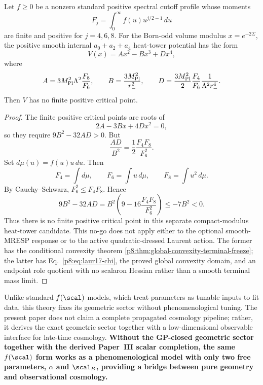 \documentclass[12pt,a4paper]{article}
\begin{document}
\begin{theorem}
\label{p8:thm:positive-heat-tower-a4-nogo}
Let \(f\ge0\) be a nonzero standard positive spectral cutoff profile whose moments
\[
F_j=\int_0^\infty f(u)u^{j/2-1}\,du
\]
are finite and positive for \(j=4,6,8\).
For the Born-odd volume modulus \(x=e^{-2\Sigma}\), the positive smooth internal \(a_0+a_2+a_4\) heat-tower potential has the form
\[
V(x)=Ax^2-Bx^3+Dx^4,
\]
where
\[
A=3M_{\rm Pl}^2\Lambda^2\frac{F_8}{F_6},\qquad
B=\frac{3M_{\rm Pl}^2}{r_-^2},\qquad
D=\frac{3M_{\rm Pl}^2}{2}\frac{F_4}{F_6}\frac{1}{\Lambda^2r_-^4}.
\]
Then \(V\) has no finite positive critical point.
\end{theorem}

\begin{proof}
The finite positive critical points are roots of
\[
2A-3Bx+4Dx^2=0,
\]
so they require \(9B^2-32AD>0\).  But
\[
\frac{AD}{B^2}=\frac12\frac{F_4F_8}{F_6^2}.
\]
Set \(d\mu(u)=f(u)u\,du\). Then
\[
F_4=\int d\mu,\qquad F_6=\int u\,d\mu,\qquad F_8=\int u^2\,d\mu.
\]
By Cauchy--Schwarz, \(F_6^2\le F_4F_8\). Hence
\[
9B^2-32AD
=
B^2\left(9-16\frac{F_4F_8}{F_6^2}\right)
\le -7B^2<0.
\]
Thus there is no finite positive critical point in this separate
compact-modulus heat-tower candidate.  This no-go does not apply either to
the optional smooth-MRESP response or to the active quadratic-dressed Laurent
action.  The former has the conditional convexity theorem
\ref{p8:thm:global-convexity-terminal-freeze}; the latter has
Eq.~\eqref{p8:eq:laur17-chi}, the proved global convexity domain, and an
endpoint role quotient with no scalaron
Hessian rather than a smooth terminal mass limit.
\end{proof}

Unlike standard $f(\scal)$ models, which treat parameters as tunable inputs to fit data, this theory fixes its geometric sector without phenomenological tuning. The present paper does not claim a complete propagated cosmology pipeline; rather, it derives the exact geometric sector together with a low-dimensional observable interface for late-time cosmology. \textbf{Without the GP-closed geometric sector together with the derived Paper~III scalar completion, the same $f(\scal)$ form works as a phenomenological model with only two free parameters, $\alpha$ and $\scal_B$, providing a bridge between pure geometry and observational cosmology.}
\end{document}
